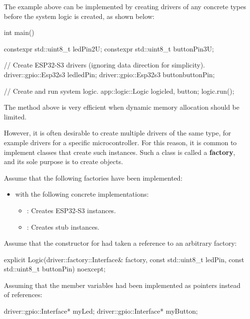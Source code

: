\noindent The example above can be implemented by creating drivers of any concrete types before the
system logic is created, as shown below:

\begin{cppcode}
int main()
{
    constexpr std::uint8_t ledPin{2U};
    constexpr std::uint8_t buttonPin{3U};

    // Create ESP32-S3 drivers (ignoring data direction for simplicity).
    driver::gpio::Esp32s3 led{ledPin};
    driver::gpio::Esp32s3 button{buttonPin};

    // Create and run system logic.
    app::logic::Logic logic{led, button};
    logic.run();
}
\end{cppcode}

\noindent The method above is very efficient when dynamic memory allocation should be limited.

However, it is often desirable to create multiple drivers of the same type, for example drivers
for a specific microcontroller. For this reason, it is common to implement classes that create
such instances. Such a class is called a \textbf{factory}, and its sole purpose is to create
objects.

Assume that the following factories have been implemented:
\begin{itemize}
  \item {} with the following concrete implementations:
  \begin{itemize}
    \item {}: Creates ESP32-S3 instances.
    \item {}: Creates stub instances.
  \end{itemize}
\end{itemize}
Assume that the constructor for  had taken a reference to an arbitrary
factory:

\begin{cppcode}
explicit Logic(driver::factory::Interface& factory,
               const std::uint8_t ledPin,
               const std::uint8_t buttonPin) noexcept;
\end{cppcode}

\noindent Assuming that the member variables had been implemented as pointers instead of
references:

\begin{cppcode}
driver::gpio::Interface* myLed;
driver::gpio::Interface* myButton;
\end{cppcode}


